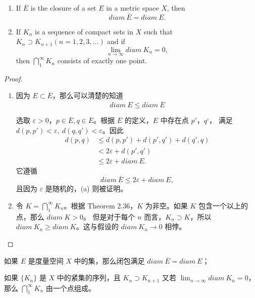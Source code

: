 \documentclass[../poma-notes.tex]{subfiles}
\begin{document}
\begin{theorem}\mbox{}
  \begin{enumerate}[label=(\alph*)]
    \item If $\overline{E}$ is the closure of a set $E$ in a metric space $X$, then
          \[diam\ \overline{E} = diam\ E.\]
    \item If $K_n$ is a sequence of compact sets in $X$ such that $K_n \supset K_{n+1} (n=1,2,3,\dots)$ and if
          \[\lim_{n \to \infty} diam\ K_n = 0,\]
          then $\bigcap_1^{\infty} K_n$ consists of exactly one point.
  \end{enumerate}
\end{theorem}

\begin{proof}
  \begin{enumerate}[label=(\alph*)]
    \item 因为 $E \subset \overline{E}$，那么可以清楚的知道
          \[diam\ E \le diam\ \overline{E}\]

          选取 $\varepsilon > 0$，$p \in \overline{E}, q \in \overline{E}$。根据 $\overline{E}$ 的定义，$E$ 中存在点 $p'$，$q‘$，
          满足 $d(p,p') < \varepsilon,\ d(q,q') < \varepsilon$。因此
          \begin{align*}
            \mathcal{} d(p,q) & \le d(p,p') + d(p',q') + d(q',q) \\
                              & < 2\varepsilon + d(p',q')        \\
                              & \le 2\varepsilon + diam\ E.
          \end{align*}
          它遵循
          \[diam\ \overline{E} \le 2\varepsilon + diam\ E,\]
          且因为 $\varepsilon$ 是随机的，(a) 则被证明。
    \item 令 $K = \bigcap_1^{\infty} K_n$。根据 Theorem 2.36，$K$ 为非空。如果 $K$ 包含一个以上的点，那么 $diam\ K > 0$。
          但是对于每个 $n$ 而言，$K_n \supset K$，所以 $diam\ K_n \ge diam\ K$。这与假设的 $diam\ K_n \to 0$ 相悖。
  \end{enumerate}
\end{proof}


\begin{anote}
  \begin{enumerate*}[label=(\alph*)]
    \item 如果 $E$ 是度量空间 $X$ 中的集，那么闭包满足 $diam\ \overline{E} = diam\ E$；
    \item 如果 $\{K_n\}$ 是 $X$ 中的紧集的序列，且 $K_n \supset K_{n+1}$ 又若 $\lim_{n \to \infty} diam\ K_n = 0$，
          那么 $\bigcap_1^{\infty} K_n$ 由一个点组成。
  \end{enumerate*}
\end{anote}
\end{document}
